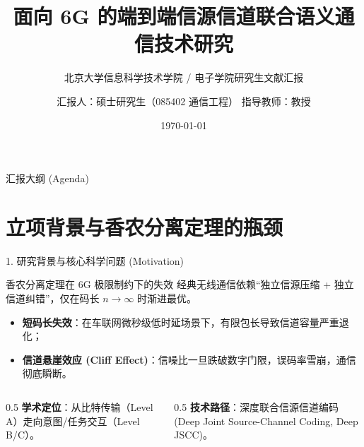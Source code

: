 \documentclass[aspectratio=169,10pt,UTF8]{ctexbeamer}
\title[面向 6G 语义通信与联合信源信道编码前沿综述]{面向 6G 的端到端信源信道联合语义通信技术研究}
\subtitle{北京大学信息科学技术学院 / 电子学院研究生文献汇报}
\author[汇报人]{汇报人：硕士研究生（085402 通信工程） \quad 指导教师：教授}
\institute[北京大学]{北京大学 · 电子信息 / 通信工程}
\date{\today}
\begin{document}
\begin{frame}
  \titlepage
\end{frame}

\begin{frame}{汇报大纲 (Agenda)}
  \tableofcontents
\end{frame}

\section{立项背景与香农分离定理的瓶颈}
\begin{frame}{1. 研究背景与核心科学问题 (Motivation)}
  \begin{block}{香农分离定理在 6G 极限制约下的失效}
    经典无线通信依赖“独立信源压缩 + 独立信道纠错”，仅在码长 $n \to \infty$ 时渐进最优。
    \begin{itemize}
      \item \textbf{短码长失效}：在车联网微秒级低时延场景下，有限包长导致信道容量严重退化；
      \item \textbf{信道悬崖效应 (Cliff Effect)}：信噪比一旦跌破数字门限，误码率雪崩，通信彻底瞬断。
    \end{itemize}
  \end{block}
  \vspace{0.2cm}
  \begin{columns}[T]
    \begin{column}{0.5\textwidth}
      \textbf{学术定位}：从比特传输（Level A）走向意图/任务交互（Level B/C）。
    \end{column}
    \begin{column}{0.5\textwidth}
      \textbf{技术路径}：深度联合信源信道编码 (Deep Joint Source-Channel Coding, Deep JSCC)。
    \end{column}
  \end{columns}
\end{frame}

\end{document}
